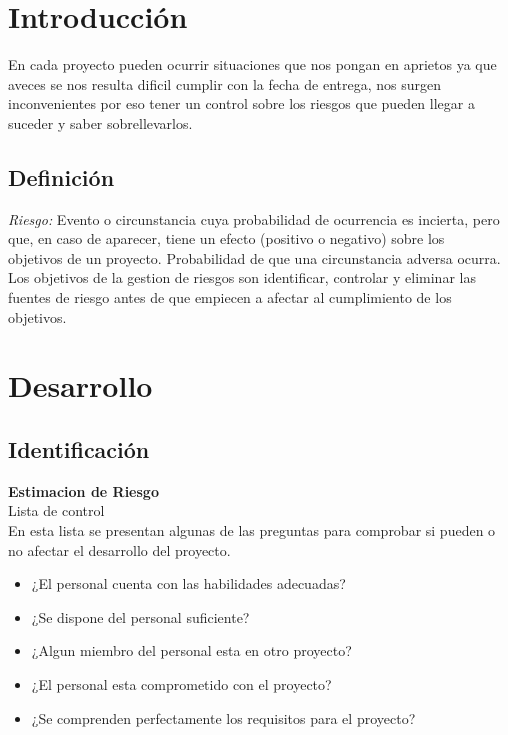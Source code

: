 \documentclass[12pt]{article}
\begin{document}
\maketitle

\tableofcontents

\section{Introducción}
En cada proyecto pueden ocurrir situaciones que nos pongan en aprietos
ya que aveces se nos resulta dificil cumplir con la fecha de entrega,
nos surgen inconvenientes por eso tener un control sobre los riesgos
que pueden llegar a suceder y saber sobrellevarlos.\\ 

\subsection{Definición}
\textit{Riesgo:} Evento o circunstancia cuya probabilidad de ocurrencia es incierta, pero
que, en caso de aparecer, tiene un efecto (positivo o negativo) sobre los\\
objetivos de un proyecto.
Probabilidad de que una circunstancia adversa ocurra.\\

Los objetivos de la gestion de riesgos son identificar, controlar y eliminar las fuentes de riesgo antes de que empiecen a afectar al cumplimiento de los objetivos.\\

\section{Desarrollo}\label{desarrollo}

\setlength{\arrayrulewidth}{1mm}
\setlength{\tabcolsep}{5pt}
\renewcommand{\arraystretch}{1.5}

\subsection{Identificación}
\textbf{Estimacion de Riesgo}\\
Lista de control\\
En esta lista se presentan algunas de las preguntas para comprobar si pueden o no afectar el desarrollo del proyecto.\\
\begin{itemize}
\item ¿El personal cuenta con las habilidades adecuadas?
\item ¿Se dispone del personal suficiente?
\item ¿Algun miembro del personal esta en otro proyecto?
\item ¿El personal esta comprometido con el proyecto?
\item ¿Se comprenden perfectamente los requisitos para el proyecto?\\
\end{itemize}
\end{document}
